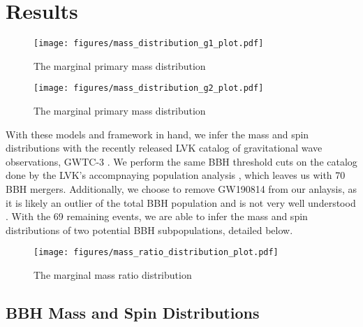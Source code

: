 \section{Results} \label{sec:results}

\begin{figure*}[ht!]
    \begin{centering}
        \texttt{[image: figures/mass\_distribution\_g1\_plot.pdf]}
        \caption{The marginal primary mass distribution}
        \label{fig:g1_mass_distribution}
    \end{centering}
\end{figure*}

\begin{figure*}[ht!]
    \begin{centering}
        \texttt{[image: figures/mass\_distribution\_g2\_plot.pdf]}
        \caption{The marginal primary mass distribution}
        \label{fig:g2_mass_distribution}
    \end{centering}
\end{figure*}

With these models and framework in hand, we infer the mass and spin distributions with the recently released LVK catalog of gravitational wave observations, GWTC-3 \citet{2021arXiv211103606T}. We perform the same BBH threshold cuts on the catalog done by the LVK's accompnaying population analysis \othreea{}, which leaves us with 70 BBH mergers. Additionally, we choose to remove GW190814 from our anlaysis, as it is likely an outlier of the total BBH population and is not very well understood . With the 69 remaining events, we are able to infer the mass and spin distributions of two potential BBH subpopulations, detailed below. 

\begin{figure}[ht!]
    \begin{centering}
        \texttt{[image: figures/mass\_ratio\_distribution\_plot.pdf]}
        \caption{The marginal mass ratio distribution}
        \label{fig:mass_ratio_distribution}
    \end{centering}
\end{figure}

\subsection{BBH Mass and Spin Distributions}

